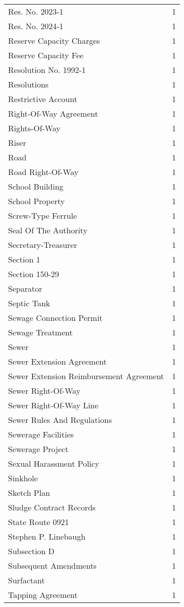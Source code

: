 \begin{longtable}{p{} p{}}
Res. No. 2023-1 & 1 \\
Res. No. 2024-1 & 1 \\
Reserve Capacity Charges & 1 \\
Reserve Capacity Fee & 1 \\
Resolution No. 1992-1 & 1 \\
Resolutions & 1 \\
Restrictive Account & 1 \\
Right-Of-Way Agreement & 1 \\
Rights-Of-Way & 1 \\
Riser & 1 \\
Road & 1 \\
Road Right-Of-Way & 1 \\
School Building & 1 \\
School Property & 1 \\
Screw-Type Ferrule & 1 \\
Seal Of The Authority & 1 \\
Secretary-Treasurer & 1 \\
Section 1 & 1 \\
Section 150-29 & 1 \\
Separator & 1 \\
Septic Tank & 1 \\
Sewage Connection Permit & 1 \\
Sewage Treatment & 1 \\
Sewer & 1 \\
Sewer Extension Agreement & 1 \\
Sewer Extension Reimbursement Agreement & 1 \\
Sewer Right-Of-Way & 1 \\
Sewer Right-Of-Way Line & 1 \\
Sewer Rules And Regulations & 1 \\
Sewerage Facilities & 1 \\
Sewerage Project & 1 \\
Sexual Harassment Policy & 1 \\
Sinkhole & 1 \\
Sketch Plan & 1 \\
Sludge Contract Records & 1 \\
State Route 0921 & 1 \\
Stephen P. Linebaugh & 1 \\
Subsection D & 1 \\
Subsequent Amendments & 1 \\
Surfactant & 1 \\
Tapping Agreement & 1 \\

\end{longtable}
